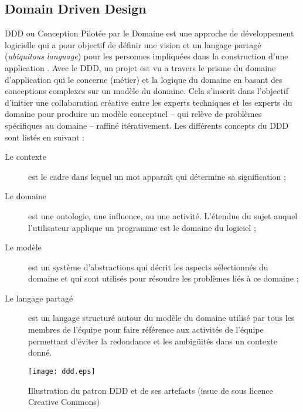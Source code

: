 \subsection{Domain Driven Design}
	
	\gls{DDD} ou Conception Pilotée par le Domaine est une 
	approche de 
	développement logicielle qui a pour objectif de définir une vision et un 
	langage partagé (\textit{ubiquitous language}) pour les personnes 
	impliquées dans la construction d'une application \cite{Evans2003}.
	Avec le \gls{DDD}, un projet est vu a travers le prisme du domaine d'application qui le concerne (métier) et la logique du domaine en basant des conceptions complexes sur un modèle du domaine. Cela s'inscrit dans l'objectif d'initier une collaboration créative entre les experts techniques et les experts du domaine pour produire un modèle conceptuel -- qui relève de problèmes spécifiques au domaine -- raffiné itérativement.
	Les différents concepts du \gls{DDD} sont listés en suivant :
	\begin{description}
		\item[Le contexte] est le cadre dans lequel un mot apparaît qui détermine sa 
		signification ;
		\item[Le domaine] est une ontologie, une influence, ou une activité. 
		L'étendue du sujet auquel l'utilisateur applique un programme est le domaine 
		du logiciel ;
		\item[Le modèle] est un système d'abstractions qui décrit les aspects 
		sélectionnés du domaine et qui sont utilisés pour résoudre les problèmes liés 
		à ce domaine ;
		\item[Le langage partagé] est un langage structuré autour du modèle du 
		domaine utilisé par tous les membres de l'équipe pour faire référence aux 
		activités de l'équipe permettant d'éviter la redondance et les ambigüités dans
		un contexte donné.
	\end{description}

\begin{figure}
	\noindent
	\centering
	\texttt{[image: ddd.eps]}
	\caption[Illustration du patron \gls{DDD} et de ses artefacts]{Illustration du 
	patron \gls{DDD} et de ses artefacts (issue de 
	\cite{Avram2006} sous licence Creative Commons)}
\label{fig:ddd}
\end{figure}

